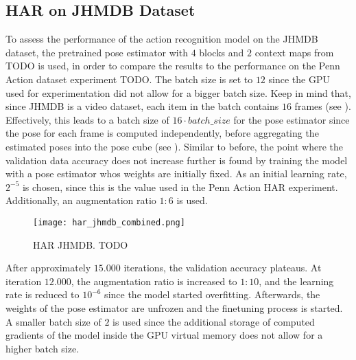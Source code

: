 \subsection{HAR on JHMDB Dataset}
To assess the performance of the action recognition model on the JHMDB dataset, the pretrained pose estimator with $4$ blocks and $2$ context maps from TODO is used, in order to compare the results to the performance on the Penn Action dataset experiment TODO.
The batch size is set to $12$ since the GPU used for experimentation did not allow for a bigger batch size.
Keep in mind that, since JHMDB is a video dataset, each item in the batch contains $16$ frames (see ).
Effectively, this leads to a batch size of $16 \cdot batch\_size$ for the pose estimator since the pose for each frame is computed independently, before aggregating the estimated poses into the pose cube (see ).
Similar to before, the point where the validation data accuracy does not increase further is found by training the model with a pose estimator whos weights are initially fixed.
As an initial learning rate, $2^{-5}$ is chosen, since this is the value used in the Penn Action HAR experiment.
Additionally, an augmentation ratio $1:6$ is used.


\begin{figure}[htb!]
    \centering
    \texttt{[image: har\_jhmdb\_combined.png]}
    \caption{HAR JHMDB. TODO}
    \label{fig:har_jhmdb_combined}
\end{figure}


After approximately $15.000$ iterations, the validation accuracy plateaus.
At iteration $12.000$, the augmentation ratio is increased to $1:10$, and the learning rate is reduced to $10^{-6}$ since the model started overfitting.
Afterwards, the weights of the pose estimator are unfrozen and the finetuning process is started.
A smaller batch size of $2$ is used since the additional storage of computed gradients of the model inside the GPU virtual memory does not allow for a higher batch size.


